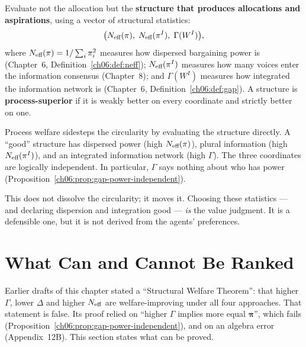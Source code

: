 \documentclass[../structural_economics_book.tex]{subfiles}
\begin{document}
\begin{definition}\label{ch12:def:process}
Evaluate not the allocation but the \textbf{structure that produces allocations and aspirations}, using a vector of structural statistics:
\begin{equation}\label{ch12:eq:process}
\big(N_{\text{eff}}(\pi),\; N_{\text{eff}}(\pi^I),\; \Gamma(W^I)\big),
\end{equation}
where $N_{\text{eff}}(\pi) = 1/\sum_i\pi_i^2$ measures how dispersed bargaining power is (Chapter~6, Definition~\ref{ch06:def:neff}); $N_{\text{eff}}(\pi^I)$ measures how many voices enter the information consensus (Chapter~8); and $\Gamma(W^I)$ measures how integrated the information network is (Chapter~6, Definition~\ref{ch06:def:gap}). A structure is \textbf{process-superior} if it is weakly better on every coordinate and strictly better on one.
\end{definition}

\begin{intuition}
Process welfare sidesteps the circularity by evaluating the structure directly. A ``good'' structure has dispersed power (high $N_{\text{eff}}(\pi)$), plural information (high $N_{\text{eff}}(\pi^I)$), and an integrated information network (high $\Gamma$). The three coordinates are logically independent. In particular, $\Gamma$ says nothing about who has power (Proposition~\ref{ch06:prop:gap-power-independent}).

This does not dissolve the circularity; it moves it. Choosing these statistics --- and declaring dispersion and integration good --- \textit{is} the value judgment. It is a defensible one, but it is not derived from the agents' preferences.
\end{intuition}


\section{What Can and Cannot Be Ranked}
\label{ch12:sec:theorem}

Earlier drafts of this chapter stated a ``Structural Welfare Theorem'': that higher $\Gamma$, lower $\Delta$ and higher $N_{\text{eff}}$ are welfare-improving under all four approaches. That statement is false. Its proof relied on ``higher $\Gamma$ implies more equal $\boldsymbol{\pi}$'', which fails (Proposition~\ref{ch06:prop:gap-power-independent}), and on an algebra error (Appendix~12B). This section states what can be proved.
\end{document}
